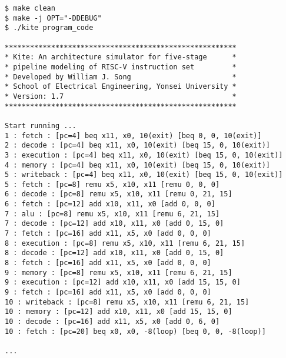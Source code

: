 \documentclass[10pt]{article}
\begin{document}
\begin{Verbatim}[frame=single,fontsize=\small]
$ make clean
$ make -j OPT="-DDEBUG" 
$ ./kite program_code

*******************************************************
* Kite: An architecture simulator for five-stage      *
* pipeline modeling of RISC-V instruction set         *
* Developed by William J. Song                        *
* School of Electrical Engineering, Yonsei University *
* Version: 1.7                                        *
*******************************************************

Start running ...
1 : fetch : [pc=4] beq x11, x0, 10(exit) [beq 0, 0, 10(exit)]
2 : decode : [pc=4] beq x11, x0, 10(exit) [beq 15, 0, 10(exit)]
3 : execution : [pc=4] beq x11, x0, 10(exit) [beq 15, 0, 10(exit)]
4 : memory : [pc=4] beq x11, x0, 10(exit) [beq 15, 0, 10(exit)]
5 : writeback : [pc=4] beq x11, x0, 10(exit) [beq 15, 0, 10(exit)]
5 : fetch : [pc=8] remu x5, x10, x11 [remu 0, 0, 0]
6 : decode : [pc=8] remu x5, x10, x11 [remu 0, 21, 15]
6 : fetch : [pc=12] add x10, x11, x0 [add 0, 0, 0]
7 : alu : [pc=8] remu x5, x10, x11 [remu 6, 21, 15]
7 : decode : [pc=12] add x10, x11, x0 [add 0, 15, 0]
7 : fetch : [pc=16] add x11, x5, x0 [add 0, 0, 0]
8 : execution : [pc=8] remu x5, x10, x11 [remu 6, 21, 15]
8 : decode : [pc=12] add x10, x11, x0 [add 0, 15, 0]
8 : fetch : [pc=16] add x11, x5, x0 [add 0, 0, 0]
9 : memory : [pc=8] remu x5, x10, x11 [remu 6, 21, 15]
9 : execution : [pc=12] add x10, x11, x0 [add 15, 15, 0]
9 : fetch : [pc=16] add x11, x5, x0 [add 0, 0, 0]
10 : writeback : [pc=8] remu x5, x10, x11 [remu 6, 21, 15]
10 : memory : [pc=12] add x10, x11, x0 [add 15, 15, 0]
10 : decode : [pc=16] add x11, x5, x0 [add 0, 6, 0]
10 : fetch : [pc=20] beq x0, x0, -8(loop) [beq 0, 0, -8(loop)]

...
\end{Verbatim}
\end{document}
